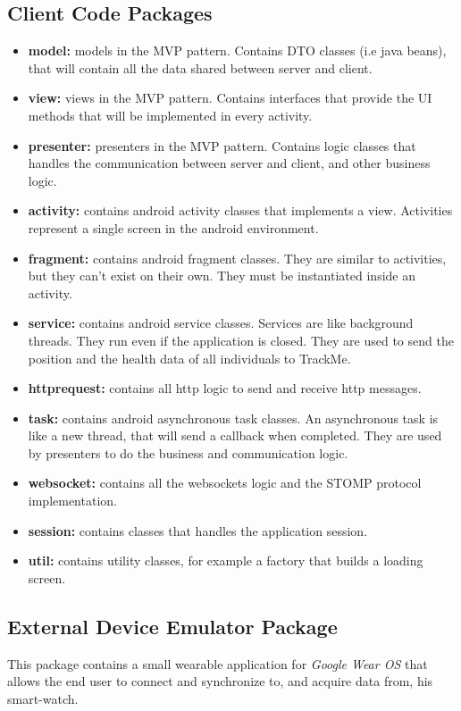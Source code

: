 \documentclass[a4paper]{article}
\begin{document}
\subsection{Client Code Packages}
\begin{itemize}
\item \textbf{model:} models in the MVP pattern. Contains DTO classes (i.e java beans), that will contain all the data shared between server and client.
\item \textbf{view:} views in the MVP pattern. Contains interfaces that provide the UI methods that will be implemented in every activity.
\item \textbf{presenter:} presenters in the MVP pattern. Contains logic classes that handles the communication between server and client, and other business logic.
\item \textbf{activity:} contains android activity classes that implements a view. Activities represent a single screen in the android environment.
\item \textbf{fragment:} contains android fragment classes. They are similar to activities, but they can't exist on their own. They must be instantiated inside an activity.
\item \textbf{service:} contains android service classes. Services are like background threads. They run even if the application is closed. They are used to send the position and the health data of all individuals to TrackMe.
\item \textbf{httprequest:} contains all http logic to send and receive http messages.
\item \textbf{task:} contains android asynchronous task classes. An asynchronous task is like a new thread, that will send a callback when completed. They are used by presenters to do the business and communication logic.
\item \textbf{websocket:} contains all the websockets logic and the STOMP protocol implementation.
\item \textbf{session:} contains classes that handles the application session.
\item \textbf{util:} contains utility classes, for example a factory that builds a loading screen.
\end{itemize}

\subsection{External Device Emulator Package}
This package contains a small wearable application for \textit{Google Wear OS} that allows the end user to connect and synchronize to, and acquire data from, his smart-watch.
\end{document}

